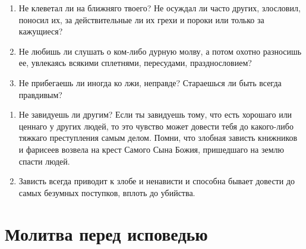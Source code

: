 \nopagebreak

\begin{mymulticols}

\begin{enumerate}

\item Не клеветал ли на ближняго твоего? Не осуждал ли часто других, злословил, поносил их, за действительные ли их грехи и пороки или только за кажущиеся?

\item Не любишь ли слушать о ком-либо дурную молву, а потом охотно разносишь ее, увлекаясь всякими сплетнями, пересудами, празднословием?

\item Не прибегаешь ли иногда ко лжи, неправде? Стараешься ли быть всегда правдивым? 
\end{enumerate}

\end{mymulticols}

\nopagebreak

\begin{mymulticols}

\begin{enumerate}

\item Не завидуешь ли другим? Если ты завидуешь тому, что есть хорошаго или ценнаго у других людей, то это чувство может довести тебя до какого-либо тяжкаго преступления самым делом. Помни, что злобная зависть книжников и фарисеев возвела на крест Самого Сына Божия, пришедшаго на землю спасти людей.

\item Зависть всегда приводит к злобе и ненависти и способна бывает довести до самых безумных поступков, вплоть до убийства.

\end{enumerate}

\end{mymulticols}

\mychapterending


\section{Молитва перед исповедью}
 

{\centering{}

} 

